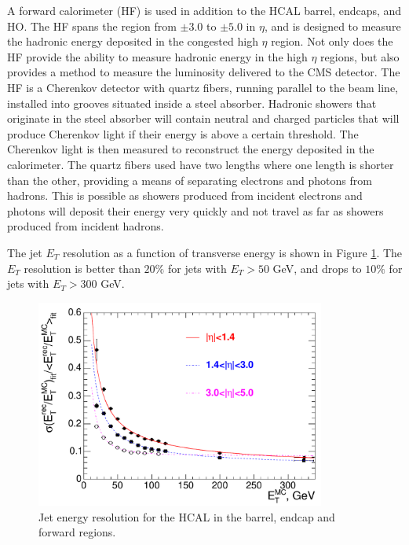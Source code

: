 A forward calorimeter (HF) is used in addition to the HCAL barrel, endcaps, and HO. 
The HF spans the region from $\pm3.0$ to $\pm5.0$ in $\eta$, and is designed to measure the hadronic energy deposited in the congested high $\eta$ region.
Not only does the HF provide the ability to measure hadronic energy in the high $\eta$ regions, but also provides a method to measure the luminosity delivered to the CMS detector.
The HF is a Cherenkov detector with quartz fibers, running parallel to the beam line,  installed into grooves situated inside a steel absorber.
Hadronic showers that originate in the steel absorber will contain neutral and charged particles that will produce Cherenkov light if their energy is above a certain threshold.
The Cherenkov light is then measured to reconstruct the energy deposited in the calorimeter.
The quartz fibers used have two lengths where one length is shorter than the other, providing a means of separating electrons and photons from hadrons.
This is possible as showers produced from incident electrons and photons will deposit their energy very quickly and not travel as far as showers produced from incident hadrons.

The jet $E_{T}$ resolution as a function of transverse energy is shown in Figure \ref{fig:jetres}. The $E_{T}$ resolution is better than $20\%$ for jets with $E_{T} > 50$ GeV, and drops to $10\%$ for jets with $E_{T} > 300$ GeV.
\begin{figure}[htpb]
\begin{center}
\includegraphics[width=0.85\textwidth]{plots/jetres.pdf}
\caption{Jet energy resolution for the HCAL in the barrel, endcap and forward regions\cite{CMS_DETECTOR}.}
\label{fig:jetres}
\end{center}
\end{figure}
